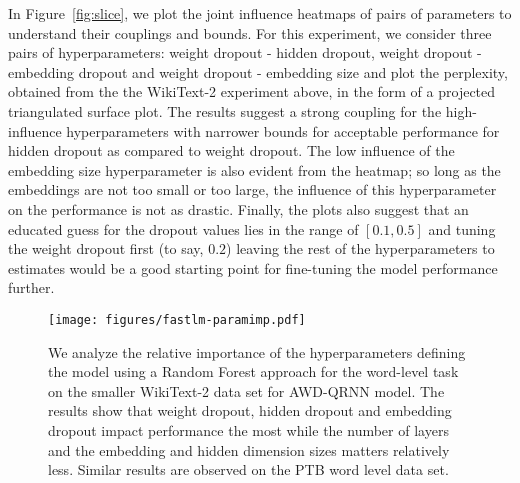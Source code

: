 \documentclass{article}
\begin{document}
In Figure~\ref{fig:slice}, we plot the joint influence heatmaps of pairs of parameters to understand their couplings and bounds. For this experiment, we consider three pairs of hyperparameters: weight dropout - hidden dropout, weight dropout - embedding dropout and  weight dropout - embedding size and plot the perplexity, obtained from the the WikiText-2 experiment above, in the form of a projected triangulated surface plot. The results suggest a strong coupling for the high-influence hyperparameters with narrower bounds for acceptable performance for hidden dropout as compared to weight dropout. The low influence of the embedding size hyperparameter is also evident from the heatmap; so long as the embeddings are not too small or too large, the influence of this hyperparameter on the performance is not as drastic. Finally, the plots also suggest that an educated guess for the dropout values lies in the range of $[0.1,0.5]$ and tuning the weight dropout first (to say, $0.2$) leaving the rest of the hyperparameters to estimates would be a good starting point for fine-tuning the model performance further. 

\begin{figure}
\centering
\texttt{[image: figures/fastlm-paramimp.pdf]}
\caption{
We analyze the relative importance of the hyperparameters defining the model using a Random Forest approach for the word-level task on the smaller WikiText-2 data set for AWD-QRNN model. The results show that weight dropout, hidden dropout and embedding dropout impact performance the most while the number of layers and the embedding and hidden dimension sizes matters relatively less. Similar results are observed on the PTB word level data set. 
}
\label{fig:hyperimp}
\end{figure}
\end{document}
